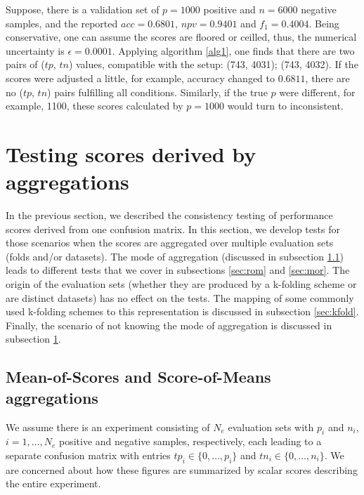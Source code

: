 \documentclass[5p, final]{elsarticle}
\begin{document}
Suppose, there is a validation set of $p=1000$ positive and $n=6000$ negative samples, and the reported $acc = 0.6801$, $npv = 0.9401$ and $f_1 = 0.4004$. Being conservative, one can assume the scores are floored or ceilled, thus, the numerical uncertainty is $\epsilon = 0.0001$. Applying algorithm \ref{alg1}, one finds that there are two pairs of ($tp$, $tn$) values, compatible with the setup: (743, 4031); (743, 4032). If the scores were adjusted a little, for example, accuracy changed to $0.6811$, there are no ($tp$, $tn$) pairs fulfilling all conditions. Similarly, if the true $p$ were different, for example, 1100, these scores calculated by $p=1000$ would turn to inconsistent.

\section{Testing scores derived by aggregations}
\label{sec:agg}

In the previous section, we described the consistency testing of performance scores derived from one confusion matrix. In this section, we develop tests for those scenarios when the scores are aggregated over multiple evaluation sets (folds and/or datasets). 
The mode of aggregation (discussed in subsection \ref{sec:rommor}) leads to different tests that we cover in subsections \ref{sec:rom} and \ref{sec:mor}. The origin of the evaluation sets (whether they are produced by a k-folding scheme or are distinct datasets) has no effect on the tests. 
The mapping of some commonly used k-folding schemes to this representation is discussed in subsection \ref{sec:kfold}. Finally, the scenario of not knowing the mode of aggregation is discussed in subsection \ref{sec:agg}.

\subsection{Mean-of-Scores and Score-of-Means aggregations}
\label{sec:rommor}

We assume there is an experiment consisting of $N_e$ evaluation sets with $p_i$ and $n_i$, $i=1,\dots,N_e$ positive and negative samples, respectively, each leading to a separate confusion matrix with entries $tp_i \in\lbrace 0, \dots, p_i\rbrace$ and $tn_i\in\lbrace 0, \dots, n_i\rbrace$. We are concerned about how these figures are summarized by scalar scores describing the entire experiment. 
\end{document}
